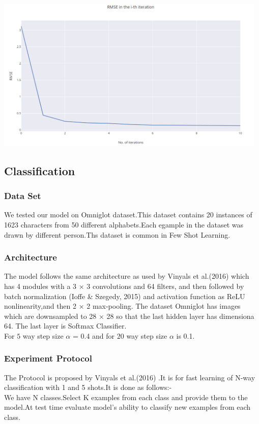 \documentclass[a4paper]{article}
\begin{document}
\begin{center}
\includegraphics[width=13cm]{capture.png}
\end{center}

\subsection{Classification}
\subsubsection{Data Set}
We tested our model on Omniglot dataset.This dataset contains 20 instances of 1623 characters from 50 different alphabets.Each egample in the dataset was drawn by different person.Ths dataset is common in Few Shot Learning.


\subsubsection{Architecture}
The model follows the same architecture as used by  Vinyals et al.(2016) \cite{Vinyals} which has 4 modules with a 3 × 3 convolutions and 64 filters, and then followed by batch normalization (Ioffe & Szegedy, 2015)\cite{Ioffe} and activation function as ReLU nonlinearity,and then 2 × 2 max-pooling.
The dataset Omniglot has images which are downsampled to 28 × 28 so that the last hidden layer has dimensiona 64. The last layer is Softmax Classifier.\\
For $5$ way step size $\alpha$ = 0.4 and for $20$ way step size $\alpha$ is 0.1.
\subsubsection{Experiment Protocol}
The Protocol  is proposed by  Vinyals et al.(2016) \cite{Vinyals}.It is for fast learning of N-way classification with 1 and 5 shots.It is done as follows:-\\
We have N classes.Select K examples from each class and provide them to the model.At test time evaluate model's ability to classify new examples from each class.
\end{document}
